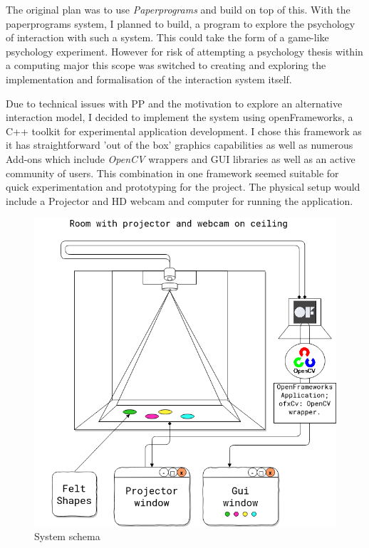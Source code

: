 \documentclass[12pt]{report}
\begin{document}
The original plan was to use \emph{Paperprograms} and build on top of this. With the
paperprograms system, I planned to build, a program to explore the psychology of
interaction with such a system. This could take the form of a game-like
psychology experiment. However for risk of attempting a psychology thesis within
a computing major this scope was switched to creating and exploring the
implementation and formalisation of the interaction system itself.

Due to technical issues with PP and the motivation to explore an alternative
interaction model, I decided to implement the system using openFrameworks, a C++
toolkit for experimental application development. I chose this framework as it
has straightforward 'out of the box' graphics capabilities as well as numerous
Add-ons which include \emph{OpenCV} \cite{opencv_library} wrappers and GUI libraries as
well as an active community of users. This combination in one framework seemed
suitable for quick experimentation and prototyping for the project. The physical
setup would include a Projector and HD webcam and computer for running the
application. \\

\begin{figure}[htbp]
\centering
\includegraphics[width=15cm]{assets/project-schema-final.png}
\caption{System schema \label{systemSchema}}
\end{figure}
\end{document}
